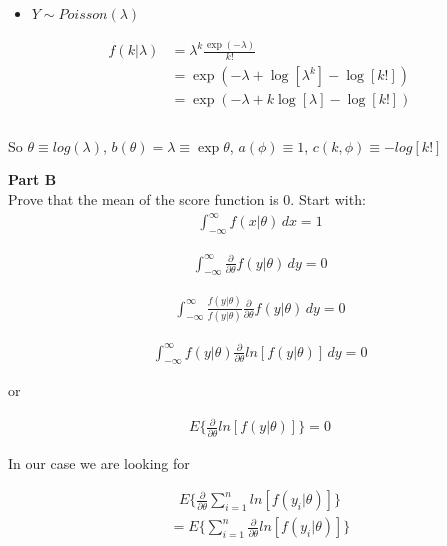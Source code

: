 \documentclass[12pt]{amsart}
\begin{document}
\bigskip
\bigskip


\begin{itemize}
    \item $Y \sim Poisson(\lambda) $
\end{itemize}
\bigskip
\bigskip

\begin{align*}
f(k|\lambda)&= \lambda^k \frac{\exp(-\lambda)}{k!}\\
&= \exp(-\lambda +\log[\lambda^k] - \log[k!])\\
&= \exp(-\lambda +k\log[\lambda] - \log[k!])\\
\end{align*}\\

So $\theta \equiv log(\lambda)$, $b(\theta) = \lambda \equiv \exp \theta$, $a(\phi)\equiv1$, $c(k,\phi)\equiv-log[k!]$

\bigskip

\bigskip
{\bf Part B} \\
\bigskip
Prove that the mean of the score function is 0. Start with:
\begin{align*}
     \int_{-\infty}^{\infty} f(x|\theta) \,dx = 1
\end{align*}


\begin{align*}
     \int_{-\infty}^{\infty} \frac{\partial}{\partial \theta}f(y|\theta) \,dy = 0
\end{align*}

\begin{align*}
     \int_{-\infty}^{\infty} \frac{f(y|\theta) }{f(y|\theta) }\frac{\partial}{\partial \theta}f(y|\theta) \,dy = 0
\end{align*}


\begin{align*}
     \int_{-\infty}^{\infty} f(y|\theta)\frac{\partial}{\partial \theta}ln[f(y|\theta)] \,dy = 0
\end{align*}

or 


\begin{align*}
     E\{\frac{\partial}{\partial \theta}ln[f(y|\theta)] \} = 0
\end{align*}

In our case we are looking for

\begin{align*}
     E\{\frac{\partial}{\partial \theta}\sum_{i=1}^{n}  ln  [f(y_i|\theta)] \} 
\end{align*}
\begin{align*}
     =E\{ \sum_{i=1}^{n} \frac{\partial}{\partial \theta} ln [f(y_i|\theta)] \} 
\end{align*}
\end{document}
